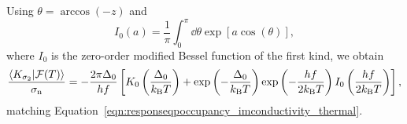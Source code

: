 Using $\theta = \arccos(-z)$ and
\begin{equation}
I_0(a)
  = \frac{1}{\pi} \int_{0}^{\pi} \dd{\theta} \exp [a \cos(\theta)],
\end{equation}
where $I_0$ is the zero-order modified Bessel function of the first kind, we obtain
\begin{equation}
\frac{\braket{K_{\sigma_2}}{\mathcal{F}(T)}}{\sigma_{\mathrm{n}}}
  =
  -\frac{2 \pi \Delta_0}{h f}
  \left[
  K_0 \left( \frac{\Delta_0}{k_\mathrm{B} T} \right)
  + \exp \left( -\frac{\Delta_0}{k_\mathrm{B} T} \right)
  \exp \left( -\frac{h f}{2 k_\mathrm{B} T} \right)
  I_0 \left( \frac{h f}{2 k_\mathrm{B} T} \right)
  \right],
\label{eqn:first-order_response.responseqpoccupancy_imconductivity_thermal}
\end{equation}
matching Equation~\ref{eqn:responseqpoccupancy_imconductivity_thermal}.
